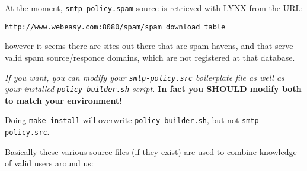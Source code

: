 At the moment, {\tt smtp-policy.spam} source is retrieved with LYNX from
the URL:
\begin{alltt}\medskip\scriptsize\medskip
http://www.webeasy.com:8080/spam/spam\_download\_table
\medskip\end{alltt}\medskip
however it seems there are sites out there that are spam havens, and
that serve valid spam source/responce domains, which are not registered
at that database.

{\em If you want, you can modify your {\tt smtp-policy.src} boilerplate
file as well as your installed {\tt\small policy-builder.sh} script.}
{\bf In fact you SHOULD modify both to match your environment!}

Doing {\tt make install} will overwrite {\tt\small policy-builder.sh},
but not {\tt smtp-policy.src}.

Basically these various source files (if they exist) are used to
combine knowledge of valid users around us:

